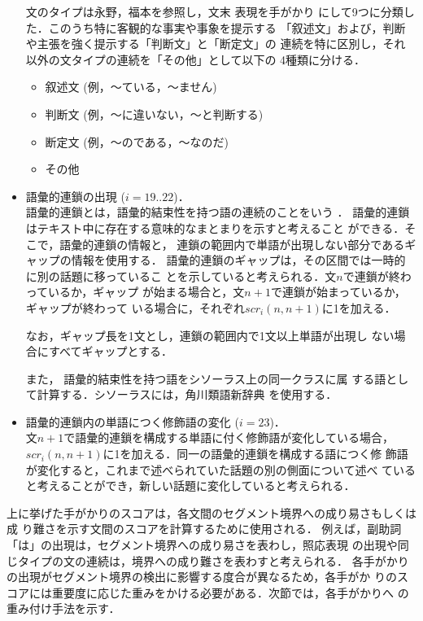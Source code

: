 \begin{itemize}
	文のタイプは永野\cite{nagano}，福本\cite{Fukumoto1}を参照し，文末
	表現を手がかり
	にして9つに分類した．このうち特に客観的な事実や事象を提示する
	「叙述文」および，判断や主張を強く提示する「判断文」と「断定文」の
	連続を特に区別し，それ以外の文タイプの連続を「その他」として以下の
	4種類に分ける．

	\begin{itemize}
	\item 叙述文 (例，〜ている，〜ません)
	\item 判断文 (例，〜に違いない，〜と判断する)
	\item 断定文 (例，〜のである，〜なのだ)
	\item その他
	\end{itemize}

\item 語彙的連鎖の出現 ($i=19..22$)．\\
	語彙的連鎖とは，語彙的結束性を持つ語の連続のことをいう
	\cite{Morris:91}．
	語彙的連鎖はテキスト中に存在する意味的なまとまりを示すと考えること
	ができる\cite{Morris:91,Barzilay:97}．そこで，語彙的連鎖の情報と，
	連鎖の範囲内で単語が出現しない部分であるギャップの情報を使用する．
	語彙的連鎖のギャップは，その区間では一時的に別の話題に移っているこ
	とを示していると考えられる．文$n$で連鎖が終わっているか，ギャップ
	が始まる場合と，文$n+1$で連鎖が始まっているか，ギャップが終わって
	いる場合に，それぞれ$scr_{i}(n,n+1)$に1を加える．
	
	なお，ギャップ長を1文とし，連鎖の範囲内で1文以上単語が出現し
	ない場合にすべてギャップとする．
	

	また，
	語彙的結束性を持つ語をシソーラス上の同一クラスに属
	する語として計算する．シソーラスには，角川類語新辞典
	\cite{kadokawa}	を使用する．

\item 語彙的連鎖内の単語につく修飾語の変化 ($i=23$)．\\
	文$n+1$で語彙的連鎖を構成する単語に付く修飾語が変化している場合，
	$scr_{i}(n,n+1)$に1を加える．同一の語彙的連鎖を構成する語につく修
	飾語が変化すると，これまで述べられていた話題の別の側面について述べ
	ていると考えることができ，新しい話題に変化していると考えられる．
\end{itemize}

上に挙げた手がかりのスコアは，各文間のセグメント境界への成り易さもしくは成
り難さを示す文間のスコアを計算するために使用される．
例えば，副助詞「は」の出現は，セグメント境界への成り易さを表わし，照応表現
の出現や同じタイプの文の連続は，境界への成り難さを表わすと考えられる．
各手がかりの出現がセグメント境界の検出に影響する度合が異なるため，各手がか
りのスコアには重要度に応じた重みをかける必要がある．次節では，各手がかりへ
の重み付け手法を示す．

